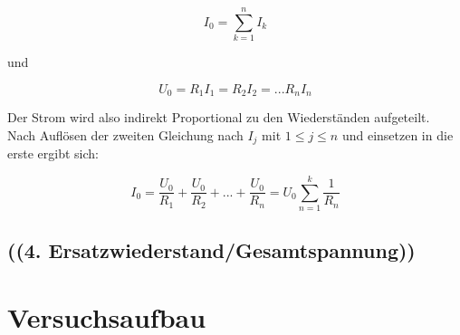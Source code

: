 \documentclass[a4paper,12pt]{article}
\begin{document}
\[ I_0 = \sum_{k=1}^{n} I_k \]

und 

\[ U_0 = R_1 I_1 = R_2 I_2 = ...R_n I_n \]

Der Strom wird also indirekt Proportional zu den Wiederständen aufgeteilt. \\
Nach Auflösen der zweiten Gleichung nach $I_j$ mit $1 \leq j \leq n$ und einsetzen in die erste
ergibt sich:

\[ I_0 = \frac{U_0}{R_1} + \frac{U_0}{R_2} + ... + \frac{U_0}{R_n} = U_0 \sum_{n=1}^k \frac{1}{R_n} \]



\subsection{((4. Ersatzwiederstand/Gesamtspannung))}
\section{Versuchsaufbau}



\end{document}
